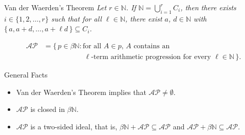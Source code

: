\documentclass{beamer}
\newcommand{\bbN}{\mathbb{N}}
\begin{document}
\begin{frame}
  \begin{block}{Van der Waerden's Theorem}
    \textsl{Let $r \in \bbN$.
    If $\bbN = \bigcup_{i=1}^r C_i$, then there exists $i \in \{1, 2,
    \ldots, r\}$ such that for all $\ell \in \bbN$, there exist $a$,
    $d \in \bbN$ with $\{\, a, a+d, \ldots, a + \ell d \,\} \subseteq
    C_i$.} 
  \end{block}

  \pause

  \begin{definition}
    \vspace{-1em}
    \begin{align*}
      \mathcal{AP} &= \{\, p \in \beta \bbN : \mbox{for all $A \in
        p$, $A$ contains an} \\
      &\hspace{5em}\mbox{ $\ell$-term arithmetic
        progression for every $\ell \in \bbN$} \,\}.
    \end{align*}
  \end{definition}

  \pause

  \begin{block}{General Facts}
    \begin{itemize}
      \item Van der Waerden's Theorem implies that $\mathcal{AP} \ne
        \emptyset$. 
        \pause

      \item $\mathcal{AP}$ is closed in $\beta\bbN$. 
        \pause

      \item $\mathcal{AP}$ is a two-sided ideal, that is, $\beta\bbN +
        \mathcal{AP} \subseteq \mathcal{AP}$ and $\mathcal{AP} +
        \beta\bbN \subseteq \mathcal{AP}$.
    \end{itemize}
  \end{block}
\end{frame}
\end{document}
